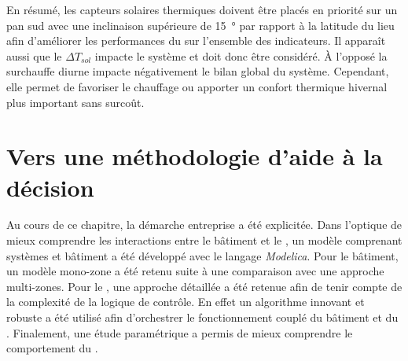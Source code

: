 En résumé, les capteurs solaires thermiques doivent être placés en priorité sur un pan sud
avec une inclinaison supérieure de \SI{15}{\degree} par rapport à la latitude du lieu afin
d’améliorer les performances du  sur l’ensemble des indicateurs. Il apparaît aussi
que le $\Delta T_{sol}$ impacte le système et doit donc être considéré. À l’opposé la surchauffe
diurne impacte négativement le bilan global du système. Cependant, elle permet de favoriser le
chauffage ou apporter un confort thermique hivernal plus important sans surcoût.





\section{Vers une méthodologie d’aide à la décision} %
\label{sec:vers_une_methodologie_d_aide_a_la_decision}
Au cours de ce chapitre, la démarche entreprise a été explicitée. Dans l’optique de mieux
comprendre les interactions entre le bâtiment et le , un modèle comprenant
systèmes et bâtiment a été développé avec le langage \textit{Modelica}. Pour le bâtiment, un
modèle mono-zone a été retenu suite à une comparaison avec une approche multi-zones.
Pour le , une approche détaillée a été retenue afin de tenir compte de la
complexité de la logique de contrôle. En effet un algorithme innovant et robuste a été
utilisé afin d’orchestrer le fonctionnement couplé du bâtiment et du .
Finalement, une étude paramétrique a permis de mieux comprendre le comportement du
.

